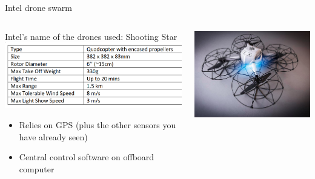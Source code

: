 \documentclass[aspectratio=169]{beamer}
\begin{document}
\begin{frame}{Intel drone swarm}
	\begin{columns}
	\begin{column}{0.6\textwidth}
	Intel's name of the drones used: Shooting Star
	\centering
	\includegraphics[width=\linewidth]{images/intel_shooting_star_specs.png}
	\begin{itemize}
		\item Relies on GPS (plus the other sensors you have already seen)
		\item Central control software on offboard computer
	\end{itemize}
	\end{column}
	
	\begin{column}{0.39\textwidth}
		\includegraphics[width=\textwidth]{images/intel_shooting_star.png}
	\end{column}
	\end{columns}
	
	\vspace{10mm}
\tiny{\color{gray}{https://newsroom.intel.com/wp-content/uploads/sites/11/2017/07/Intel-Shooting-Star-Tech-Fact-Sheet-073117-1.pdf}}
\end{frame}
\end{document}
